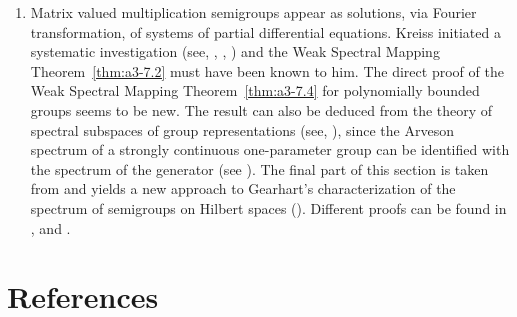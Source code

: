 \begin{enumerate}[label=\emph{Section 3.\arabic*:}, wide, itemsep=1ex]
\item  
Matrix valued multiplication semigroups appear as solutions, via Fourier transformation, of systems of partial differential equations.
Kreiss initiated a systematic investigation (see, \eg \textcite{kreiss:1958}, \textcite{kreiss:1959}, \textcite{millerstrang:1966}) and the Weak Spectral Mapping Theorem~\ref{thm:a3-7.2} must have been known to him. 
The direct proof of the Weak Spectral Mapping Theorem~\ref{thm:a3-7.4} for polynomially bounded groups seems to be new. 
The result can also be deduced from the theory of spectral subspaces of group representations (see, \eg \textcite{combesdelaroche:1978}), since the Arveson spectrum of a strongly continuous one-parameter group can be identified with the spectrum of the generator (see \textcite{evans:1976}). 
The final part of this section is taken from \textcite{greiner:1985} and yields a new approach to Gearhart's characterization of the spectrum of semigroups on Hilbert spaces (\textcite{gearhart:1978}). 
Different proofs can be found in \textcite{herbst:1983}, \textcite{howland:1984} and \textcite{pruess:1984}. 
\end{enumerate}
\section*{References}
{\RaggedRight
  \printbibliography[heading=none]
 }



